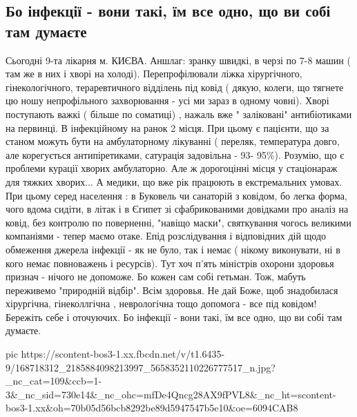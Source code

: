  
 
 
 
 

\subsection{Бо інфекції - вони такі, їм все одно, що ви собі там думаєте}
\label{sec:04_04_2021.fb.kovalenko_ljudmila.1.bolnica_kiev}

Сьогодні 9-та лікарня м. КИЄВА. Аншлаг: зранку швидкі, в черзі по 7-8 машин (
там же в них і хворі на холоді). Перепрофілювали ліжка хірургічного,
гінекологічного, тераревтичного відділень під ковід ( дякую, колеги, що тягнете
цю ношу непрофільного захворювання - усі ми зараз в одному човні). Хворі
поступають важкі ( більше по соматиці) , нажаль вже " заліковані" антибіотиками
на первинці. В інфекційному на ранок 2 місця.  При цьому є пацієнти, що за
станом можуть бути на амбулаторному лікуванні ( переляк, температура довго, але
корегується антипіретиками, сатурація задовільна - 93- 95\%). Розумію, що є
проблеми курації хворих амбулаторно. Але ж дорогоцінні місця у стаціонараж для
тяжких хворих... А медики, що вже рік працюють в екстремальних умовах. При
цьому  серед населення : в  Буковель чи санаторій з ковідом, бо легка форма,
чого вдома сидіти, в літак і в Єгипет зі сфабрикованими довідками про аналіз на
ковід, без контролю по поверненні, "навіщо маски", святкування  чогось великими
компаніями - тепер маємо отаке. Епід розслідування і відповідних дій щодо
обмеження джерела інфекції - як не було, так і немає ( нікому виконувати, ні в
кого немає повноважень і ресурсів). Тут хоч п'ять міністрів охорони здоровья
признач - нічого не допоможе. Бо кожен сам собі гетьман. Тож, мабуть переживемо
"природній відбір". Всім здоровья. Не дай Боже, щоб знадобилася хірургічна,
гінеколлгічна , неврологічна тощо допомога - все під ковідом! Бережіть себе і
оточуючих. Бо інфекції - вони такі, їм все одно, що ви собі там думаєте.

\ifcmt
  pic https://scontent-bos3-1.xx.fbcdn.net/v/t1.6435-9/168718312_2185884098213997_5658352110226777517_n.jpg?_nc_cat=109&ccb=1-3&_nc_sid=730e14&_nc_ohc=mfDe4Qncg28AX9fPVL8&_nc_ht=scontent-bos3-1.xx&oh=70b05d56bcb8292be89d5947547b5e10&oe=6094CAB8
\fi

